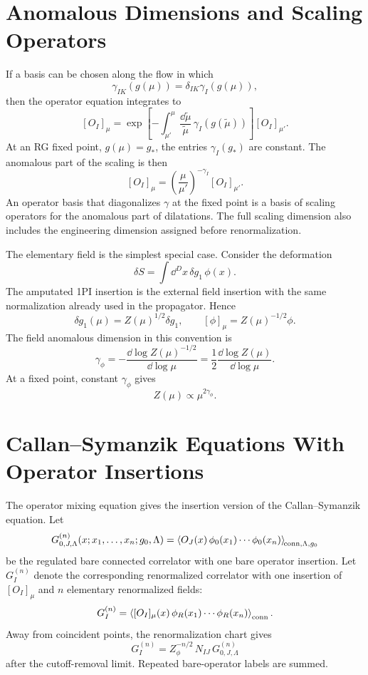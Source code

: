 \section{Anomalous Dimensions and Scaling Operators}

If a basis can be chosen along the flow in which
\[
  \gamma_{IK}(g(\mu))=\delta_{IK}\gamma_I(g(\mu)),
\]
then the operator equation integrates to
\[
  [O_I]_\mu
  =
  \exp\!\left[
    -\int_{\mu'}^\mu
    \frac{\dd\widetilde\mu}{\widetilde\mu}\,
    \gamma_I(g(\widetilde\mu))
  \right]
  [O_I]_{\mu'} .
\]
At an RG fixed point, \(g(\mu)=g_\ast\), the entries \(\gamma_I(g_\ast)\) are
constant.  The anomalous part of the scaling is then
\[
  [O_I]_\mu
  =
  \left(\frac{\mu}{\mu'}\right)^{-\gamma_I}
  [O_I]_{\mu'} .
\]
An operator basis that diagonalizes \(\gamma\) at the fixed point is a basis of
scaling operators for the anomalous part of dilatations.  The full scaling
dimension also includes the engineering dimension assigned before
renormalization.

The elementary field is the simplest special case.  Consider the deformation
\[
  \delta S=\int\dd^Dx\,\delta g_1\,\phi(x).
\]
The amputated 1PI insertion is the external field insertion with the same
normalization already used in the propagator.  Hence
\[
  \delta g_1(\mu)=Z(\mu)^{1/2}\delta g_1,
  \qquad
  [\phi]_\mu=Z(\mu)^{-1/2}\phi .
\]
The field anomalous dimension in this convention is
\[
  \gamma_\phi
  =
  -\frac{\dd\log Z(\mu)^{-1/2}}{\dd\log\mu}
  =
  \frac12\frac{\dd\log Z(\mu)}{\dd\log\mu}.
\]
At a fixed point, constant \(\gamma_\phi\) gives
\[
  Z(\mu)\propto \mu^{2\gamma_\phi}.
\]

\section{Callan--Symanzik Equations With Operator Insertions}

The operator mixing equation gives the insertion version of the
Callan--Symanzik equation.  Let
\[
  G_{0,J,\Lambda}^{(n)}
  (x;x_1,\ldots,x_n;g_0,\Lambda)
  =
  \left\langle
    O_J(x)\,\phi_0(x_1)\cdots\phi_0(x_n)
  \right\rangle_{\!{\rm conn},\Lambda,g_0}
\]
be the regulated bare connected correlator with one bare operator insertion.
Let \(G_I^{(n)}\) denote the corresponding renormalized correlator with one
insertion of \([O_I]_\mu\) and \(n\) elementary renormalized fields:
\[
  G_I^{(n)}
  =
  \left\langle
    [O_I]_\mu(x)\,
    \phi_R(x_1)\cdots\phi_R(x_n)
  \right\rangle_{\rm conn}.
\]
Away from coincident points, the renormalization chart gives
\[
  G_I^{(n)}
  =
  Z_\phi^{-n/2}\,N_{IJ}\,G_{0,J,\Lambda}^{(n)}
\]
after the cutoff-removal limit.  Repeated bare-operator labels are summed.

